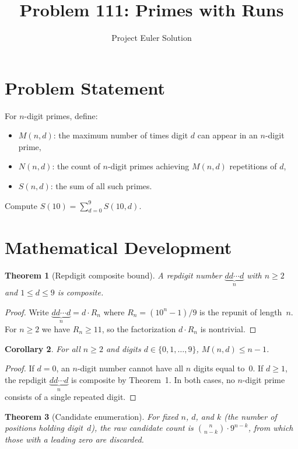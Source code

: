 \documentclass[12pt]{article}
\title{Problem 111: Primes with Runs}
\author{Project Euler Solution}
\date{}
\newtheorem{theorem}{Theorem}
\newtheorem{corollary}[theorem]{Corollary}
\begin{document}
\maketitle

\section{Problem Statement}

For $n$-digit primes, define:
\begin{itemize}
    \item $M(n, d)$: the maximum number of times digit $d$ can appear in an $n$-digit prime,
    \item $N(n, d)$: the count of $n$-digit primes achieving $M(n, d)$ repetitions of $d$,
    \item $S(n, d)$: the sum of all such primes.
\end{itemize}
Compute $\displaystyle S(10) = \sum_{d=0}^{9} S(10, d)$.

\section{Mathematical Development}

\begin{theorem}[Repdigit composite bound]
A repdigit number $\underbrace{dd \cdots d}_{n}$ with $n \ge 2$ and $1 \le d \le 9$ is composite.
\end{theorem}

\begin{proof}
Write $\underbrace{dd \cdots d}_{n} = d \cdot R_n$ where $R_n = (10^n - 1)/9$ is the repunit of length~$n$. For $n \ge 2$ we have $R_n \ge 11$, so the factorization $d \cdot R_n$ is nontrivial.
\end{proof}

\begin{corollary}
For all $n \ge 2$ and digits $d \in \{0,1,\ldots,9\}$, $M(n,d) \le n - 1$.
\end{corollary}

\begin{proof}
If $d = 0$, an $n$-digit number cannot have all $n$ digits equal to~0. If $d \ge 1$, the repdigit $\underbrace{dd\cdots d}_n$ is composite by Theorem~1. In both cases, no $n$-digit prime consists of a single repeated digit.
\end{proof}

\begin{theorem}[Candidate enumeration]
For fixed $n$, $d$, and $k$ (the number of positions holding digit~$d$), the raw candidate count is $\binom{n}{n-k} \cdot 9^{n-k}$, from which those with a leading zero are discarded.
\end{theorem}
\end{document}
